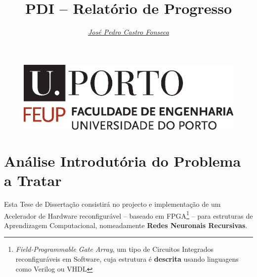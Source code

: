 \documentclass[a4paper, onecolumn, 10pt]{article}
\title{\Huge PDI -- Relatório de Progresso}
\author{\itshape \href{mailto:ee11126@fe.up.pt}{José Pedro Castro Fonseca}   }
\begin{document}
\pagestyle{plain}

\begin{figure}
	\centering
	\includegraphics[scale=0.3]{logo_feup.eps}
\end{figure}
\sffamily
\maketitle



\rmfamily\pagestyle{fancy}
\section{Análise Introdutória do Problema a Tratar}\label{sec:analiseProb}
Esta Tese de Dissertação consistirá no projecto e implementação de um Acelerador de Hardware reconfigurável -- baseado em FPGA\footnote{\textit{Field-Programmable Gate Array}, um tipo de Circuitos Integrados reconfiguráveis em Software, cuja estrutura é \textbf{descrita} usando linguagens como Verilog ou VHDL} -- para estruturas de Aprendizagem Computacional, nomeadamente \textbf{Redes Neuronais Recursivas}. 	
\end{document}
